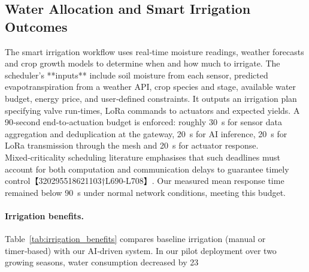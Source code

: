 \subsection{Water Allocation and Smart Irrigation Outcomes}
\label{sec:water_allocation}

The smart irrigation workflow uses real‑time moisture readings, weather forecasts and crop growth models to determine when and how much to irrigate.  The scheduler’s **inputs** include soil moisture from each sensor, predicted evapotranspiration from a weather API, crop species and stage, available water budget, energy price, and user‑defined constraints.  It outputs an irrigation plan specifying valve run‑times, LoRa commands to actuators and expected yields.  A 90‑second end‑to‑actuation budget is enforced: roughly 30~s for sensor data aggregation and deduplication at the gateway, 20~s for AI inference, 20~s for LoRa transmission through the mesh and 20~s for actuator response.  Mixed‑criticality scheduling literature emphasises that such deadlines must account for both computation and communication delays to guarantee timely control【320295518621103†L690-L708】.  Our measured mean response time remained below \SI{90}{s} under normal network conditions, meeting this budget.

\paragraph{Irrigation benefits.}
Table~\ref{tab:irrigation_benefits} compares baseline irrigation (manual or timer‑based) with our AI‑driven system.  In our pilot deployment over two growing seasons, water consumption decreased by 23~%

